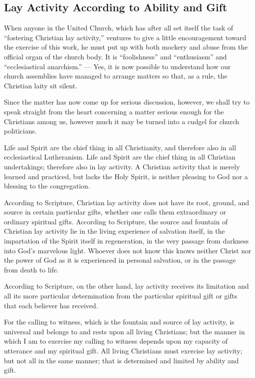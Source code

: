 
\subsection{Lay Activity According to Ability and Gift}

When anyone in the United Church, which has after all set itself the task of “fostering Christian lay activity,” ventures to give a little encouragement toward the exercise of this work, he must put up with both mockery and abuse from the official organ of the church body. It is “foolishness” and “enthusiasm” and “ecclesiastical anarchism.” — Yes, it is now possible to understand how our church assemblies have managed to arrange matters so that, as a rule, the Christian laity sit silent.

Since the matter has now come up for serious discussion, however, we shall try to speak straight from the heart concerning a matter serious enough for the Christians among us, however much it may be turned into a cudgel for church politicians.

Life and Spirit are the chief thing in all Christianity, and therefore also in all ecclesiastical Lutheranism. Life and Spirit are the chief thing in all Christian undertakings; therefore also in lay activity. A Christian activity that is merely learned and practiced, but lacks the Holy Spirit, is neither pleasing to God nor a blessing to the congregation.

According to Scripture, Christian lay activity does not have its root, ground, and source in certain particular gifts, whether one calls them extraordinary or ordinary spiritual gifts. According to Scripture, the source and fountain of Christian lay activity lie in the living experience of salvation itself, in the impartation of the Spirit itself in regeneration, in the very passage from darkness into God’s marvelous light. Whoever does not know this knows neither Christ nor the power of God as it is experienced in personal salvation, or in the passage from death to life.

According to Scripture, on the other hand, lay activity receives its limitation and all its more particular determination from the particular spiritual gift or gifts that each believer has received.

For the calling to witness, which is the fountain and source of lay activity, is universal and belongs to and rests upon all living Christians; but the manner in which I am to exercise my calling to witness depends upon my capacity of utterance and my spiritual gift. All living Christians must exercise lay activity; but not all in the same manner; that is determined and limited by ability and gift.

